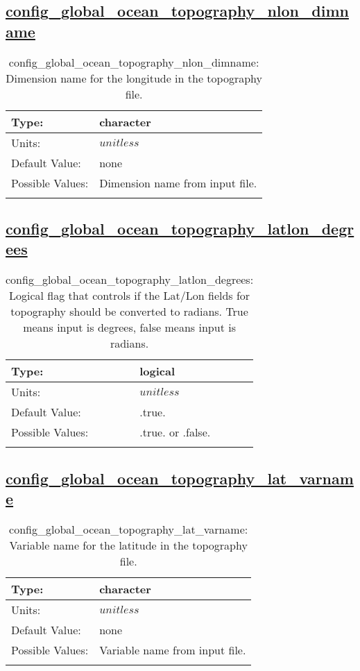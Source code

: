 \subsection[config\_global\_ocean\_topography\_nlon\_dimname]{\hyperref[sec:nm_tab_global_ocean]{config\_global\_ocean\_topography\_nlon\_dimname}}
\label{subsec:nm_sec_config_global_ocean_topography_nlon_dimname}
\begin{center}
\begin{longtable}{| p{2.0in} || p{4.0in} |}
    \hline
    Type: & character \\
    \hline
    Units: & $unitless$ \\
    \hline
    Default Value: & none \\
    \hline
    Possible Values: & Dimension name from input file. \\
    \hline
    \caption{config\_global\_ocean\_topography\_nlon\_dimname: Dimension name for the longitude in the topography file.}
\end{longtable}
\end{center}
\subsection[config\_global\_ocean\_topography\_latlon\_degrees]{\hyperref[sec:nm_tab_global_ocean]{config\_global\_ocean\_topography\_latlon\_degrees}}
\label{subsec:nm_sec_config_global_ocean_topography_latlon_degrees}
\begin{center}
\begin{longtable}{| p{2.0in} || p{4.0in} |}
    \hline
    Type: & logical \\
    \hline
    Units: & $unitless$ \\
    \hline
    Default Value: & .true. \\
    \hline
    Possible Values: & .true. or .false. \\
    \hline
    \caption{config\_global\_ocean\_topography\_latlon\_degrees: Logical flag that controls if the Lat/Lon fields for topography should be converted to radians. True means input is degrees, false means input is radians.}
\end{longtable}
\end{center}
\subsection[config\_global\_ocean\_topography\_lat\_varname]{\hyperref[sec:nm_tab_global_ocean]{config\_global\_ocean\_topography\_lat\_varname}}
\label{subsec:nm_sec_config_global_ocean_topography_lat_varname}
\begin{center}
\begin{longtable}{| p{2.0in} || p{4.0in} |}
    \hline
    Type: & character \\
    \hline
    Units: & $unitless$ \\
    \hline
    Default Value: & none \\
    \hline
    Possible Values: & Variable name from input file. \\
    \hline
    \caption{config\_global\_ocean\_topography\_lat\_varname: Variable name for the latitude in the topography file.}
\end{longtable}
\end{center}
